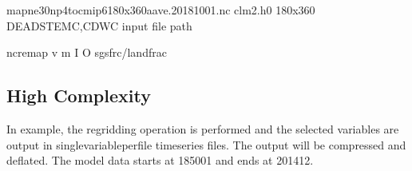 \documentclass[letterpaper,10pt,english]{sphinxmanual}
\begin{document}
\begin{sphinxVerbatim}[commandchars=\\\{\}]
map\PYGZus{}ne30np4\PYGZus{}to\PYGZus{}cmip6\PYGZus{}180x360\PYGZus{}aave.20181001.nc   
clm2.h0                                          
180x360                                         
DEADSTEMC,CDWC                                     
\PYGZlt{}input file path\PYGZgt{}                             

ncremap \PYGZhy{}v  \PYGZhy{}m  \PYGZhy{}I  \PYGZhy{}O  \PYGZhy{}\PYGZhy{}sgs\PYGZus{}frc/landfrac
\end{sphinxVerbatim}


\subsection{High Complexity}
\label{\detokenize{lnd_regrid:high-complexity}}
In example, the regridding operation is performed and the selected variables are output in single\sphinxhyphen{}variable\sphinxhyphen{}per\sphinxhyphen{}file time\sphinxhyphen{}series files.
The output will be compressed and deflated. The model data starts at 1850\sphinxhyphen{}01 and ends at 2014\sphinxhyphen{}12.
\end{document}
